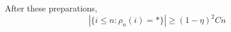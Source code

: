 \documentclass[11pt,a4paper]{article}
\begin{document}
After these preparations, 
\begin{equation}
|\{i \leq n: \rho_n(i) = *\}| \geq (1-\eta)^2 C n
\end{equation}







\end{document}
